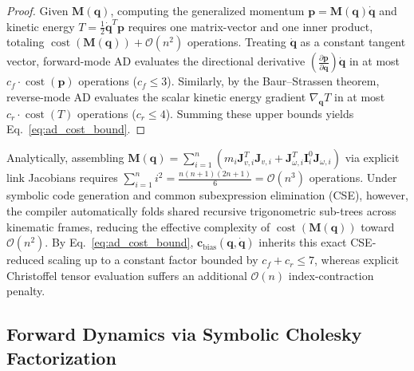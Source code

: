 \documentclass[fleqn,10pt]{article}
\begin{document}
	\begin{proof}
		Given $\bm{M}(\bm{q})$, computing the generalized momentum $\bm{p} = \bm{M}(\bm{q})\dot{\bm{q}}$ and kinetic energy $T = \frac{1}{2}\dot{\bm{q}}^T\bm{p}$ requires one matrix-vector and one inner product, totaling $\operatorname{cost}(\bm{M}(\bm{q})) + \mathcal{O}(n^2)$ operations. Treating $\dot{\bm{q}}$ as a constant tangent vector, forward-mode AD evaluates the directional derivative $\left(\frac{\partial \bm{p}}{\partial \bm{q}}\right)\dot{\bm{q}}$ in at most $c_f \cdot \operatorname{cost}(\bm{p})$ operations ($c_f \le 3$). Similarly, by the Baur--Strassen theorem, reverse-mode AD evaluates the scalar kinetic energy gradient $\nabla_{\bm{q}} T$ in at most $c_r \cdot \operatorname{cost}(T)$ operations ($c_r \le 4$). Summing these upper bounds yields Eq.~\eqref{eq:ad_cost_bound}.
	\end{proof}
	
	Analytically, assembling $\bm{M}(\bm{q}) = \sum_{i=1}^n (m_i \bm{J}_{v,i}^T\bm{J}_{v,i} + \bm{J}_{\omega,i}^T \bm{I}_i^0 \bm{J}_{\omega,i})$ via explicit link Jacobians requires $\sum_{i=1}^n i^2 = \frac{n(n+1)(2n+1)}{6} = \mathcal{O}(n^3)$ operations. Under symbolic code generation and common subexpression elimination (CSE), however, the compiler automatically folds shared recursive trigonometric sub-trees across kinematic frames, reducing the effective complexity of $\operatorname{cost}(\bm{M}(\bm{q}))$ toward $\mathcal{O}(n^2)$. By Eq.~\eqref{eq:ad_cost_bound}, $\bm{c}_{\mathrm{bias}}(\bm{q},\dot{\bm{q}})$ inherits this exact CSE-reduced scaling up to a constant factor bounded by $c_f + c_r \le 7$, whereas explicit Christoffel tensor evaluation suffers an additional $\mathcal{O}(n)$ index-contraction penalty.
	
	\subsection{Forward Dynamics via Symbolic Cholesky Factorization}
	\label{subsec:cholesky_dynamics}
	
\end{document}

